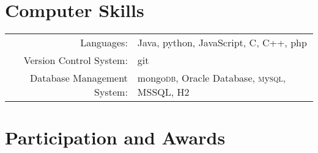 \documentclass[a4paper,10pt]{article} %
\begin{document}

%
%
%


\section{Computer Skills}

\begin{tabular}{rl}
Languages: & Java, python, JavaScript, C, C++, php\\

Version Control System: & git\\

Database Management System: & mongo\textsc{db}, Oracle Database, \textsc{m}y\textsc{sql}, \textsc{MSSQL}, \textsc{H}2
\end{tabular}


\section{Participation and Awards}
\end{document}
